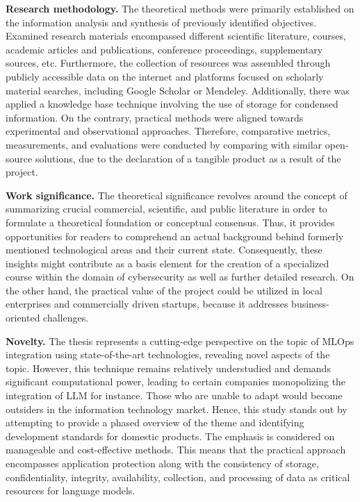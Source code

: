 \textbf{Research methodology.} The theoretical methods were primarily established on the information analysis and synthesis of previously identified objectives. Examined research materials encompassed different scientific literature, courses, academic articles and publications, conference proceedings, supplementary sources, etc. Furthermore, the collection of resources was assembled through publicly accessible data on the internet and platforms focused on scholarly material searches, including Google Scholar or Mendeley. Additionally, there was applied a knowledge base technique involving the use of storage for condensed information. On the contrary, practical methods were aligned towards experimental and observational approaches. Therefore, comparative metrics, measurements, and evaluations were conducted by comparing with similar open-source solutions, due to the declaration of a tangible product as a result of the project.

\textbf{Work significance.} The theoretical significance revolves around the concept of summarizing crucial commercial, scientific, and public literature in order to formulate a theoretical foundation or conceptual consensus. Thus, it provides opportunities for readers to comprehend an actual background behind formerly mentioned technological areas and their current state. Consequently, these insights might contribute as a basis element for the creation of a specialized course within the domain of cybersecurity as well as further detailed research. On the other hand, the practical value of the project could be utilized in local enterprises and commercially driven startups, because it addresses business-oriented challenges.

\textbf{Novelty.} The thesis represents a cutting-edge perspective on the topic of MLOps integration using state-of-the-art technologies, revealing novel aspects of the topic. However, this technique remains relatively understudied and demands significant computational power, leading to certain companies monopolizing the integration of LLM for instance. Those who are unable to adapt would become outsiders in the information technology market. Hence, this study stands out by attempting to provide a phased overview of the theme and identifying development standards for domestic products. The emphasis is considered on manageable and cost-effective methods. This means that the practical approach encompasses application protection along with the consistency of storage, confidentiality, integrity, availability, collection, and processing of data as critical resources for language models.


